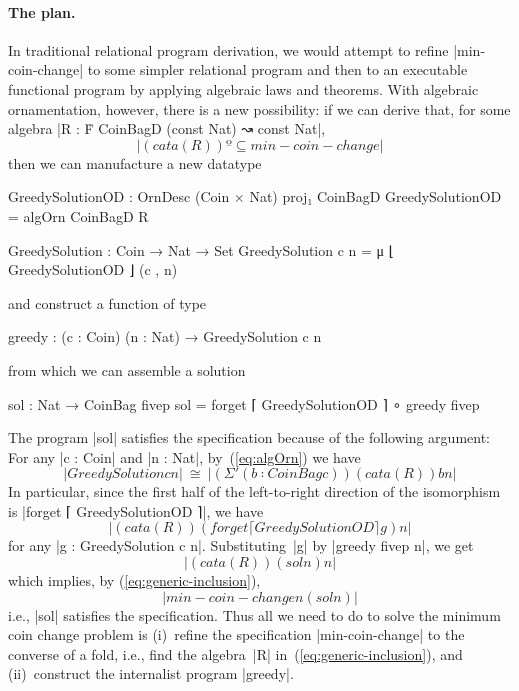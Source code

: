 \paragraph{The plan.}
In traditional relational program derivation, we would attempt to refine |min-coin-change| to some simpler relational program and then to an executable functional program by applying algebraic laws and theorems.
With algebraic ornamentation, however, there is a new possibility: if we can derive that, for some algebra |R : Ḟ CoinBagD (const Nat) ↝ const Nat|,
\begin{equation}
|(cata(R)) º ⊆ min-coin-change|
\label{eq:generic-inclusion}
\end{equation}
then we can manufacture a new datatype
\begin{code}
GreedySolutionOD : OrnDesc (Coin × Nat) proj₁ CoinBagD
GreedySolutionOD = algOrn CoinBagD R

GreedySolution : Coin → Nat → Set
GreedySolution c n = μ ⌊ GreedySolutionOD ⌋ (c , n)
\end{code}
and construct a function of type
\begin{code}
greedy : (c : Coin) (n : Nat) → GreedySolution c n
\end{code}
from which we can assemble a solution
\begin{code}
sol : Nat → CoinBag fivep
sol = forget ⌈ GreedySolutionOD ⌉ ∘ greedy fivep
\end{code}
The program |sol| satisfies the specification because of the following argument:
For any |c : Coin| and |n : Nat|, by~(\ref{eq:algOrn}) we have
\[ |GreedySolution c n| ~\cong~ |(Σ'(b ∶ CoinBag c)) (cata(R)) b n| \]
In particular, since the first half of the left-to-right direction of the isomorphism is |forget ⌈ GreedySolutionOD ⌉|, we have
\[ |(cata(R)) (forget ⌈ GreedySolutionOD ⌉ g) n| \]
for any |g : GreedySolution c n|.
Substituting~|g| by |greedy fivep n|, we get
\[ |(cata(R)) (sol n) n| \]
which implies, by (\ref{eq:generic-inclusion}),
\[ |min-coin-change n (sol n)| \]
i.e., |sol| satisfies the specification.
Thus all we need to do to solve the minimum coin change problem is (i)~refine the specification |min-coin-change| to the converse of a fold, i.e., find the algebra~|R| in~(\ref{eq:generic-inclusion}), and (ii)~construct the internalist program |greedy|.

